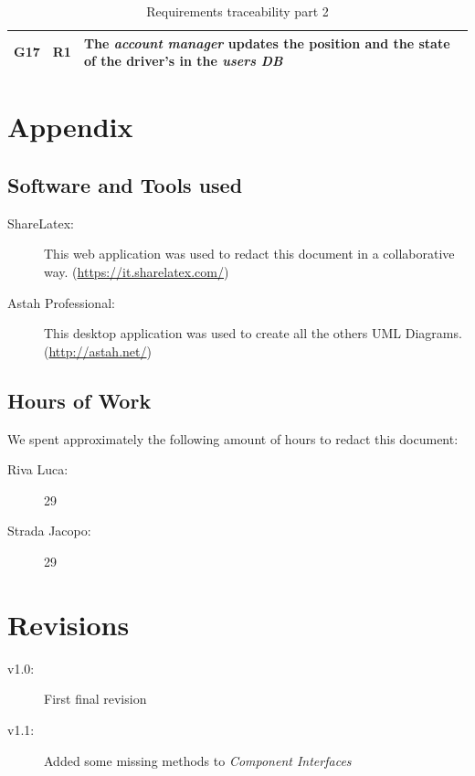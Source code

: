 \documentclass[a4paper]{article}
\begin{document}
\begin{table} [H]
\begin{center}
\begin{tabular}{ |M|M|m{\customTableWidth}|  }
    \hline
    \hline

    \textbf{G17} & \textbf{R1} & The \textit{account manager} updates the position and the state of the driver's in the \textit{users DB}\\
    
    \hline


        

\end{tabular}
\end{center}
\label{table:requirementsTraceabilityPt2}
\caption{Requirements traceability part 2}
\end{table}

\section{Appendix}

\subsection{Software and Tools used}

\begin{description}
\item[ShareLatex:] This web application was used to redact this document in a collaborative way. 
\newline (\url{https://it.sharelatex.com/})
\item[Astah Professional:] This desktop application was used to create all the others UML Diagrams.
\newline (\url{http://astah.net/})
\end{description}

\subsection{Hours of Work}
We spent approximately the following amount of hours to redact this document:
\begin{description}
\item[Riva Luca:] 29
\item[Strada Jacopo:] 29
\end{description}

\section{Revisions}

\begin{description}
    \item[v1.0:] First final revision
    \item[v1.1:] Added some missing methods to \emph{Component Interfaces}
\end{description}
\end{document}
